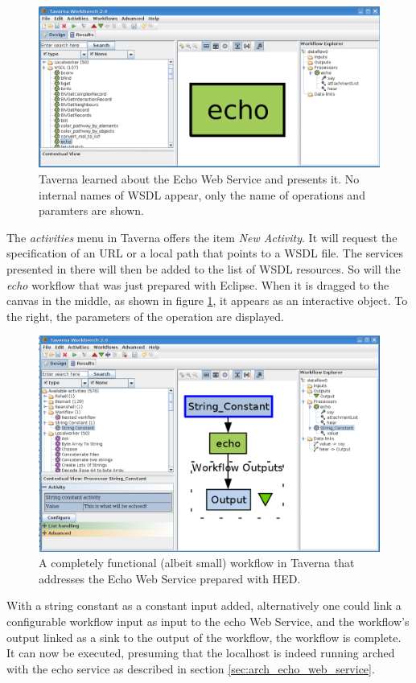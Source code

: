 \begin{figure}
\includegraphics[width=.7\columnwidth]{wsdl_echo_taverna_minimal.png}
\caption{Taverna learned about the Echo Web Service and presents it. No
internal names of WSDL appear, only the name of operations and paramters are
shown.}
\label{fig:wsdlEchoTavernaMinimal}
\end{figure}

The \textit{activities} menu in Taverna offers the item \textit{New Activity}.
It will request the specification of an URL or a local path that points to a
WSDL file. The services presented in there will then be added to the list of
WSDL resources. So will the \textit{echo} workflow that was just prepared with
Eclipse. When it is dragged to the canvas in the middle, as shown in figure
\ref{fig:wsdlEchoTavernaMinimal}, it appears as an interactive object. To the
right, the parameters of the operation are displayed.

\begin{figure}
\includegraphics[width=.7\columnwidth]{wsdl_echo_taverna_context.png}
\caption{A completely functional (albeit small) workflow in Taverna that
addresses the Echo Web Service prepared with HED.}
\label{fig:wsdlEchoTavernaContext}
\end{figure}

With a string constant as a constant input added, alternatively one could link a
configurable workflow input as input to the echo Web Service, and the
workflow's output linked as a sink to the output of the workflow, the workflow
is complete. It can now be executed, presuming that the localhost is indeed
running arched with the echo service as described in section
\ref{sec:arch_echo_web_service}.

